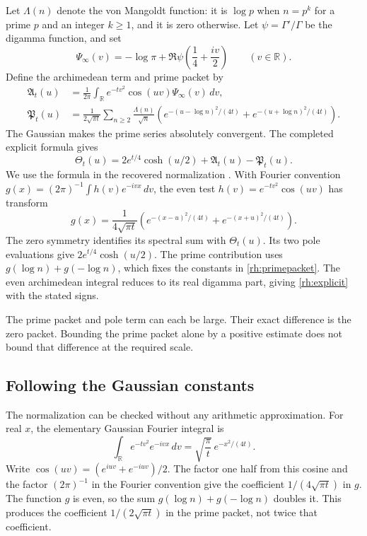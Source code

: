 Let \(\Lambda(n)\) denote the von Mangoldt function: it is \(\log p\) when \(n=p^k\) for a prime \(p\) and an integer \(k\ge1\), and it is zero otherwise. Let \(\psi=\Gamma'/\Gamma\) be the digamma function, and set
\begin{equation}\label{rh:psiinf}
\Psi_\infty(v)=-\log\pi+
\Re\psi\left(\frac14+\frac{iv}{2}\right)
\qquad(v\in\mathbb R).
\end{equation}
Define the archimedean term and prime packet by
\begin{align}
\mathfrak A_t(u)&=\frac1{2\pi}\int_{\mathbb R}
e^{-tv^2}\cos(uv)\Psi_\infty(v)\,dv,
\label{rh:arch}\\
\mathfrak P_t(u)&=\frac1{2\sqrt{\pi t}}
\sum_{n\ge2}\frac{\Lambda(n)}{\sqrt n}
\left(e^{-(u-\log n)^2/(4t)}+
e^{-(u+\log n)^2/(4t)}\right).
\label{rh:primepacket}
\end{align}
The Gaussian makes the prime series absolutely convergent. The completed explicit formula gives
\begin{equation}\label{rh:explicit}
\Theta_t(u)=2e^{t/4}\cosh(u/2)+\mathfrak A_t(u)-\mathfrak P_t(u).
\end{equation}
We use the formula in the recovered normalization \cite{KomorebiHeat,BondarenkoRadchenkoSeip}. With Fourier convention
\(g(x)=(2\pi)^{-1}\int h(v)e^{-ivx}\,dv\), the even test
\(h(v)=e^{-tv^2}\cos(uv)\) has transform
\[
g(x)=\frac1{4\sqrt{\pi t}}
\left(e^{-(x-u)^2/(4t)}+e^{-(x+u)^2/(4t)}\right).
\]
The zero symmetry identifies its spectral sum with \(\Theta_t(u)\).
Its two pole evaluations give \(2e^{t/4}\cosh(u/2)\). The prime contribution uses \(g(\log n)+g(-\log n)\), which fixes the constants in \eqref{rh:primepacket}. The even archimedean integral reduces to its real digamma part, giving \eqref{rh:explicit} with the stated signs.

The prime packet and pole term can each be large. Their exact difference is the zero packet. Bounding the prime packet alone by a positive estimate does not bound that difference at the required scale.

\subsection{Following the Gaussian constants}

The normalization can be checked without any arithmetic approximation. For real \(x\), the elementary Gaussian Fourier integral is
\[
\int_{\mathbb R}e^{-tv^2}e^{-ivx}\,dv
=\sqrt{\frac\pi t}\,e^{-x^2/(4t)}.
\]
Write \(\cos(uv)=(e^{iuv}+e^{-iuv})/2\). The factor one half from this cosine and the factor \((2\pi)^{-1}\) in the Fourier convention give the coefficient \(1/(4\sqrt{\pi t})\) in \(g\). The function \(g\) is even, so the sum \(g(\log n)+g(-\log n)\) doubles it. This produces the coefficient \(1/(2\sqrt{\pi t})\) in the prime packet, not twice that coefficient.

